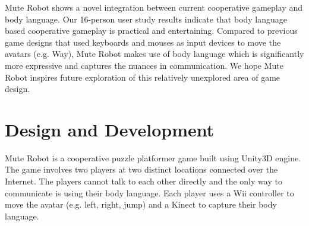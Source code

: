 \documentclass{chi-ext}
\begin{document}

Mute Robot shows a novel integration between current cooperative gameplay and body language. Our 16-person user study results indicate that body language based cooperative gameplay is practical and entertaining. 
Compared to previous game designs that used keyboards and mouses as input devices to move the avatars (e.g. Way\cite{Way}), Mute Robot makes use of body language which is significantly more expressive and captures the nuances in communication. 
We hope Mute Robot inspires future exploration of this relatively unexplored area of game design.  

 
  
\section{Design and Development}
Mute Robot is a cooperative puzzle platformer game built using Unity3D\cite{Unity3D} engine. 
The game involves two players at two distinct locations connected over the Internet. 
The players cannot talk to each other directly and the only way to communicate is using their body language. 
Each player uses a Wii\cite{Wii} controller to move the avatar (e.g. left, right, jump) and a Kinect to capture their body language. 
\end{document}
